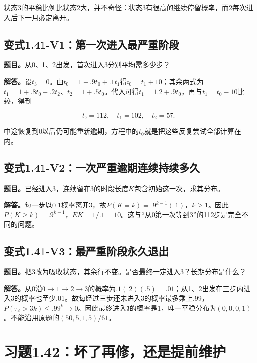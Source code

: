 \documentclass[
  11pt,
  a4paper,
  UTF8,
  fontset=fandol]{ctexart}
\begin{document}
状态3的平稳比例比状态2大，并不奇怪：状态3有很高的继续停留概率，而2每次进入后下一月必定离开。

\subsection{变式1.41-V1：第一次进入最严重阶段}\label{ux53d8ux5f0f1.41-v1ux7b2cux4e00ux6b21ux8fdbux5165ux6700ux4e25ux91cdux9636ux6bb5}

\textbf{题目。}从0、1、2出发，首次进入3分别平均需多少步？

\textbf{解答。}设\(t_3=0\)。由\(t_0=1+.9t_0+.1t_1\)得\(t_0=t_1+10\)；其余两式为\(t_1=1+.8t_0+.2t_2\)、\(t_2=1+.5t_0\)。代入可得\(t_1=1.2+.9t_0\)，再与\(t_1=t_0-10\)比较，得到

\[
\boxed{t_0=112,\quad t_1=102,\quad t_2=57.}
\]

中途恢复到0以后仍可能重新逾期，方程中的\(t_0\)就是把这些反复尝试全部计算在内。

\subsection{变式1.41-V2：一次严重逾期连续持续多久}\label{ux53d8ux5f0f1.41-v2ux4e00ux6b21ux4e25ux91cdux903eux671fux8fdeux7eedux6301ux7eedux591aux4e45}

\textbf{题目。}已经进入3，连续留在3的时段长度\(K\)包含初始这一次，求其分布。

\textbf{解答。}每一步以0.1概率离开3，故\(P(K=k)=.9^{k-1}(.1)\)，\(k\ge1\)。因此\(P(K\ge k)=.9^{k-1}\)，\(EK=1/.1=10\)。这与``从0第一次等到3''的112步是完全不同的问题。

\subsection{变式1.41-V3：最严重阶段永久退出}\label{ux53d8ux5f0f1.41-v3ux6700ux4e25ux91cdux9636ux6bb5ux6c38ux4e45ux9000ux51fa}

\textbf{题目。}把3改为吸收状态，其余行不变。是否最终一定进入3？长期分布是什么？

\textbf{解答。}从0沿\(0\to1\to2\to3\)的概率为\(.1(.2)(.5)=.01\)；从1、2出发在三步内进入3的概率也至少.01。故每经过三步还未进入3的概率最多乘上.99，\(P(\tau_3>3k)\le.99^k\to0\)。因此最终进入3的概率是1，唯一平稳分布为\(\boxed{(0,0,0,1)}\)。不能沿用原题的\((50,5,1,5)/61\)。

\section{习题1.42：坏了再修，还是提前维护}\label{ux4e60ux98981.42ux574fux4e86ux518dux4feeux8fd8ux662fux63d0ux524dux7ef4ux62a4}
\end{document}
